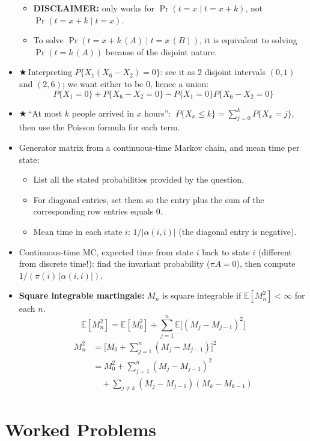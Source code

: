 \documentclass[8pt,letterpaper]{extarticle}
\newcommand{\cs}{{\color{red!75!black}$\bigstar$}\,} %
\begin{document}
\begin{multicols}{2}
\begin{itemize}
\begin{itemize}
      \item \textbf{DISCLAIMER:} only works for $\Pr(t=x\mid t=x+k)$, not $\Pr(t=x+k\mid t=x)$.
      \item To solve $\Pr(t=x+k\,(A)\mid t=x\,(B))$, it is equivalent to solving $\Pr(t=k\,(A))$ because of the disjoint nature.
    \end{itemize}
  \item \cs Interpreting $P\{X_1(X_6-X_2)=0\}$: see it as 2 disjoint intervals $(0,1)$ and $(2,6)$; we want either to be $0$, hence a union:
    \[ P\{X_1=0\}+P\{X_6-X_2=0\}-P\{X_1=0\}P\{X_6-X_2=0\} \]
  \item \cs ``At most $k$ people arrived in $x$ hours'': $\ P\{X_x\le k\}=\sum_{j=0}^{k}P\{X_x=j\}$, then use the Poisson formula for each term.
  \item Generator matrix from a continuous-time Markov chain, and mean time per state:
    \begin{itemize}
      \item List all the stated probabilities provided by the question.
      \item For diagonal entries, set them so the entry plus the sum of the corresponding row entries equals $0$.
      \item Mean time in each state $i$: $1/|\alpha(i,i)|$ (the diagonal entry is negative).
    \end{itemize}
  \item Continuous-time MC, expected time from state $i$ back to state $i$ (different from discrete time!): find the invariant probability ($\pi A=0$), then compute $1/(\pi(i)\,|\alpha(i,i)|)$.
  \item \textbf{Square integrable martingale:} $M_n$ is square integrable if $\mathbb{E}[M_n^2]<\infty$ for each $n$.
    \[ \mathbb{E}[M_n^2]=\mathbb{E}[M_0^2]+\sum_{j=1}^{n}\mathbb{E}\big[(M_j-M_{j-1})^2\big] \]
    \[ \begin{aligned}
      M_n^2 &= \Big[M_0+\sum_{j=1}^{n}(M_j-M_{j-1})\Big]^2 \\
            &= M_0^2+\sum_{j=1}^{n}(M_j-M_{j-1})^2 \\
            &\quad + \sum_{j\neq k}(M_j-M_{j-1})(M_k-M_{k-1})
    \end{aligned} \]
\end{itemize}

\section{Worked Problems}

\end{multicols}
\end{document}
